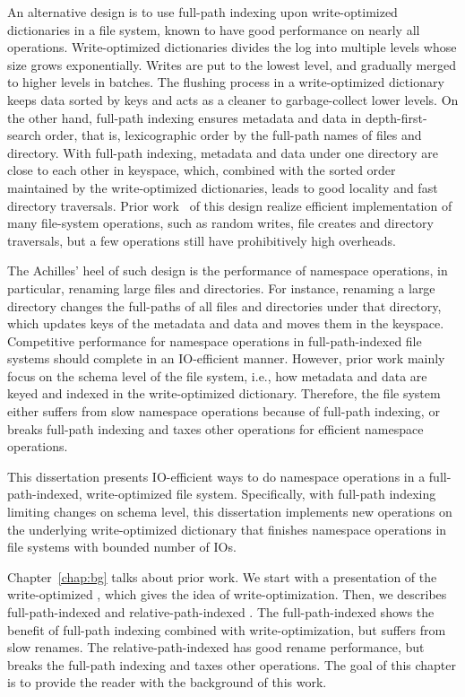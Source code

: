 An alternative design is to use full-path indexing upon write-optimized
dictionaries in a file system, known to have good performance on nearly all
operations.
Write-optimized dictionaries divides the log into multiple levels whose size
grows exponentially.
Writes are put to the lowest level, and gradually merged to higher levels in
batches.
The flushing process in a write-optimized dictionary keeps data sorted by keys
and acts as a cleaner to garbage-collect lower levels.
On the other hand, full-path indexing ensures metadata and data in
depth-first-search order, that is, lexicographic order by the full-path names
of files and directory.
With full-path indexing, metadata and data under one directory are close to each
other in keyspace, which, combined with the sorted order maintained by the
write-optimized dictionaries, leads to good locality and fast directory
traversals.
Prior work~\citep{betrfs1,betrfs1tos,betrfs2,betrfs2tos,betrfs3} of this design
realize efficient implementation of many file-system operations, such as random
writes, file creates and directory traversals,
but a few operations still have prohibitively high overheads.

The Achilles' heel of such design is the performance of namespace operations,
in particular, renaming large files and directories.
For instance, renaming a large directory changes the full-paths of all files
and directories under that directory, which updates keys of the metadata and
data and moves them in the keyspace.
Competitive performance for namespace operations in full-path-indexed file
systems should complete in an IO-efficient manner.
However, prior work mainly focus on the schema level of the file system, i.e.,
how metadata and data are keyed and indexed in the write-optimized dictionary.
Therefore, the file system either suffers from slow namespace operations because
of full-path indexing, or breaks full-path indexing and
taxes other operations for efficient namespace operations.

This dissertation presents IO-efficient ways to do namespace operations in a
full-path-indexed, write-optimized file system.
Specifically, with full-path indexing limiting changes on schema level,
this dissertation implements new operations on the underlying write-optimized
dictionary that finishes namespace operations in file systems with
bounded number of IOs.

Chapter~\ref{chap:bg} talks about prior work.
We start with a presentation of the write-optimized \bets, which gives the idea
of write-optimization.
Then, we describes full-path-indexed \betrfs and relative-path-indexed \betrfs.
The full-path-indexed \betrfs shows the benefit of full-path indexing combined
with write-optimization, but suffers from slow renames.
The relative-path-indexed \betrfs has good rename performance, but breaks the
full-path indexing and taxes other operations.
The goal of this chapter is to provide the reader with the background of this
work.

